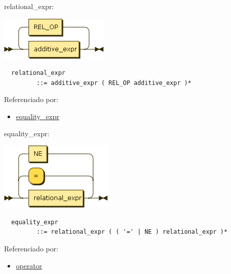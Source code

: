 \begin{minipage}{\textwidth}
  \protect\hypertarget{relational_expr}{}{relational\_expr:}

  \includegraphics[width=2.06250in,height=0.83333in]{diagram/relational_expr.png}

  \begin{verbatim}
  relational_expr
         ::= additive_expr ( REL_OP additive_expr )*
  \end{verbatim}

  Referenciado por:

  \begin{itemize}
      \tightlist%
    \item
      \protect\hyperlink{equality_expr}{equality\_expr}
  \end{itemize}

\end{minipage}

\begin{minipage}{\textwidth}
  \protect\hypertarget{equality_expr}{}{equality\_expr:}

  \includegraphics[width=2.14583in,height=1.29167in]{diagram/equality_expr.png}

  \begin{verbatim}
  equality_expr
         ::= relational_expr ( ( '=' | NE ) relational_expr )*
  \end{verbatim}

  Referenciado por:

  \begin{itemize}
      \tightlist%
    \item
      \protect\hyperlink{operator}{operator}
  \end{itemize}

\end{minipage}

